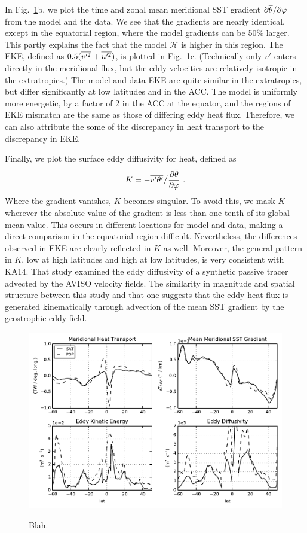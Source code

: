 \documentclass[10pt]{article}
\newcommand{\pd}[2]{ \frac{\partial #1}{\partial #2} }
\newcommand{\ol}{\ensuremath{\overline}}
\begin{document}
In Fig.~\ref{fig:H}b, we plot the time and zonal mean meridional SST gradient $\partial \ol{\theta} /\partial \varphi$ from the model and the data. We see that the gradients are nearly identical, except in the equatorial region, where the model gradients can be 50\% larger. This partly explains the fact that the model $\mathcal{H}$ is higher in this region. The EKE, defined as $0.5 ( \ol{v'^2} + \ol{u'^2} )$, is plotted in Fig.~\ref{fig:H}c. (Technically only $v'$ enters directly in the meridional flux, but the eddy velocities are relatively isotropic in the extratropics.) The model and data EKE are quite similar in the extratropics, but differ significantly at low latitudes and in the ACC. The model is uniformly more energetic, by a factor of 2 in the ACC at the equator, and the regions of EKE mismatch are the same as those of differing eddy heat flux. Therefore, we can also attribute the some of the discrepancy in heat transport to the discrepancy in EKE.

Finally, we plot the surface eddy diffusivity for heat, defined as
\begin{equation}
K = - \ol{v'\theta'} \big / \pd{\ol{\theta}}{\varphi} \ .
\end{equation}
Where the gradient vanishes, $K$ becomes singular. To avoid this, we mask $K$ wherever the absolute value of the gradient is less than one tenth of its global mean value. This occurs in different locations for model and data, making a direct comparison in the equatorial region difficult. Nevertheless, the differences observed in EKE are clearly reflected in $K$ as well. Moreover, the general pattern in $K$, low at high latitudes and high at low latitudes, is very consistent with KA14. That study examined the eddy diffusivity of a synthetic passive tracer advected by the AVISO velocity fields. The similarity in magnitude and spatial structure between this study and that one suggests that the eddy heat flux is generated kinematically through advection of the mean SST gradient by the geostrophic eddy field.

\begin{figure}[t!]
  \noindent \includegraphics{../figures/MHT_gradient_EKE_diffusivity.pdf}\\
  \caption{Blah.}
  \label{fig:H}
\end{figure}
\end{document}
